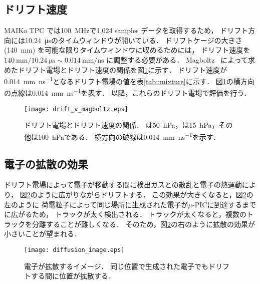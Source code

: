 \documentclass[../master]{subfiles}
\begin{document}
\subsection{ドリフト速度}
MAIKo TPC では\SI{100}{\mega\hertz}で1,024 samples データを取得するため，
ドリフト方向には\SI{10.24}{\micro\second}のタイムウィンドウが開いている．
ドリフトケージの大きさ (\SI{140}{\milli\metre}) を可能な限りタイムウィンドウに収めるためには，
ドリフト速度を$\SI{140}{\milli\metre}/\SI{10.24}{\micro\second} \sim \SI{0.014}{\milli\metre\per\nano\second}$
に調整する必要がある．
Magboltz~\cite{magboltz} によって求めたドリフト電場とドリフト速度の関係を図\ref{fig::drift_v_magboltz}に示す．
ドリフト速度が\SI{0.014}{\milli\metre\per\nano\second}となるドリフト電場の値を表\ref{tab::mixture}に示す．
図\ref{fig::drift_v_magboltz}の横方向の点線は\SI{0.014}{\milli\metre\per\nano\second}を表す．
以降，これらのドリフト電場で評価を行う．
\begin{figure}
  \centering
  \texttt{[image: drift\_v\_magboltz.eps]}
  \caption[ドリフト電場とドリフト速度の関係．]
          {ドリフト電場とドリフト速度の関係．
            \Methane は\SI{50}{\hecto\pascal}，\isoButane は\SI{15}{\hecto\pascal}，その他は\SI{100}{\hecto\pascal}である．
            横方向の破線は\SI{0.014}{\milli\metre\per\nano\second}を示す．}
          \label{fig::drift_v_magboltz}
\end{figure}

\subsection{電子の拡散の効果}
ドリフト電場によって電子が移動する間に検出ガスとの散乱と電子の熱運動により，
図\ref{fig::diffusion-image}のように広がりながらドリフトする．
この効果が大きくなると，図\ref{fig::diffusion-image}の左のように
荷電粒子によって同じ場所に生成された電子が$\mu$-PICに到達するまでに広がるため，
トラックが太く検出される．
トラックが太くなると，複数のトラックを分離することが難しくなる．
そのため，図\ref{fig::diffusion-image}の右のように拡散の効果が小さいことが望まれる．
\begin{figure}
  \centering
  \texttt{[image: diffusion\_image.eps]}
  \caption[電子が拡散するイメージ．]
          {電子が拡散するイメージ．
          同じ位置で生成された電子でもドリフトする間に位置が拡散する．}
  \label{fig::diffusion-image}
\end{figure}
\end{document}
